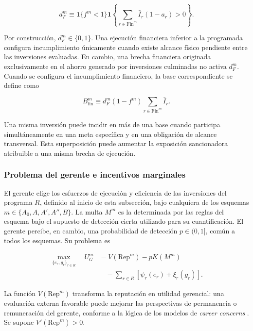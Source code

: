 \begin{equation}
\label{eq:incumplimiento_avance_financiero}
d_F^m
\equiv
\mathbf{1}\{f^m<1\}
\mathbf{1}
\left\{
\sum_{r\in\mathrm{Fin}^m}
\bar I_r(1-a_r)>0
\right\}.
\end{equation}

Por construcción, \(d_F^m\in\{0,1\}\). Una ejecución financiera inferior a la programada configura incumplimiento únicamente cuando existe alcance físico pendiente entre las inversiones evaluadas. En cambio, una brecha financiera originada exclusivamente en el ahorro generado por inversiones culminadas no activa \(d_F^m\). Cuando se configura el incumplimiento financiero, la base correspondiente se define como

\begin{equation}
\label{eq:base_financiera}
B_{\mathrm{fin}}^m
\equiv
d_F^m
(1-f^m)
\sum_{r\in\mathrm{Fin}^m}
\bar I_r.
\end{equation}

Una misma inversión puede incidir en más de una base cuando participa simultáneamente en una meta específica y en una obligación de alcance transversal. Esta superposición puede aumentar la exposición sancionadora atribuible a una misma brecha de ejecución.

\subsubsection{Problema del gerente e incentivos marginales}

El gerente elige los esfuerzos de ejecución y eficiencia de las inversiones del programa \(R\), definido al inicio de esta subsección, bajo cualquiera de los esquemas \(m\in\{A_0,A,A',A'',B\}\). La multa \(M^m\) es la determinada por las reglas del esquema bajo el supuesto de detección cierta utilizado para su cuantificación. El gerente percibe, en cambio, una probabilidad de detección \(p\in(0,1]\), común a todos los esquemas. Su problema es

\begin{equation}
\label{eq:problema_gerente}
\begin{aligned} 
\max_{\{e_r,g_r\}_{r\in R}}
\quad
U_G^{m}
&=
V\left(\mathrm{Rep}^{m}\right)
-
pK\left(M^{m}\right)
\\
&\quad
-
\sum_{r\in R}
\left[
\psi_r(e_r)
+
\xi_r(g_r)
\right].
\end{aligned}
\end{equation}

La función \(V(\mathrm{Rep}^m)\) transforma la reputación en utilidad gerencial: una evaluación externa favorable puede mejorar las perspectivas de permanencia o remuneración del gerente, conforme a la lógica de los modelos de \textit{career concerns} \citep{holmstrom1999managerial,dewatripont1999economics}. Se supone \(V'(\mathrm{Rep}^m)>0\).


